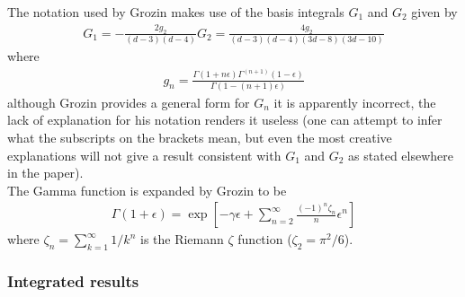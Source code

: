\documentclass[11pt]{article}
\begin{document}
The notation used by Grozin makes use of the basis integrals $G_1$ and $G_2$ given by
\begin{align}
G_1 = -\frac{2g_2}{(d-3)(d-4)}
G_2 = \frac{4g_2}{(d-3)(d-4)(3d-8)(3d-10)}
\end{align}
where
\begin{align}
g_n = \frac{\Gamma(1+n\epsilon)\Gamma^(n+1)(1-\epsilon)}{\Gamma(1-(n+1)\epsilon)}
\end{align}
although Grozin provides a general form for $G_n$ it is apparently incorrect, the lack of explanation for his notation renders it useless (one can attempt to infer what the subscripts on the brackets mean, but even the most creative explanations will not give a result consistent with $G_1$ and $G_2$ as stated elsewhere in the paper).\\

The Gamma function is expanded by Grozin to be
\begin{align}
\Gamma(1+\epsilon) = \exp\left[-\gamma\epsilon + \sum_{n=2}^{\infty} \frac{(-1)^n\zeta_n}{n}\epsilon^n\right]
\end{align}
where $\zeta_n=\sum_{k=1}^{\infty} 1/k^n$ is the Riemann $\zeta$ function ($\zeta_2 = \pi^2/6$).\\

\subsubsection{Integrated results}
\end{document}
